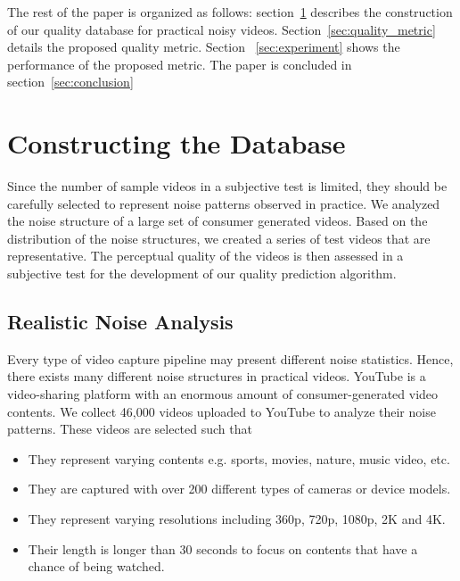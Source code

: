\documentclass{sig-alternate}
\begin{document}
The rest of the paper is organized as follows: section~\ref{sec:noise_quailty_database} describes the construction of our quality database for practical noisy videos. Section~\ref{sec:quality_metric} details the proposed quality metric. Section ~\ref{sec:experiment} shows the performance of the proposed metric. The paper is concluded in section~\ref{sec:conclusion}

\section{Constructing the Database}
\label{sec:noise_quailty_database}
Since the number of sample videos in a subjective test is limited, they should be carefully selected to represent noise patterns observed in practice. We analyzed the noise structure of a large set of consumer generated videos. Based on the distribution of the noise structures, we created a series of test videos that are representative. The perceptual quality of the videos is then assessed in a subjective test for the development of our quality prediction algorithm.
\subsection{Realistic Noise Analysis}
\label{sec:noise_analysis}
Every type of video capture pipeline may present different noise statistics. Hence, there exists many different noise structures in practical videos. YouTube is a video-sharing platform with an enormous amount of consumer-generated video contents. We collect 46,000 videos uploaded to YouTube to analyze their noise patterns. These videos are selected such that
\begin{itemize}[leftmargin=*]
\setlength\itemsep{-0.2em}
\item They represent varying contents e.g. sports, movies, nature, music video, etc. 
\item They are captured with over 200 different types of cameras or device models.
\item They represent varying resolutions including 360p, 720p, 1080p, 2K and 4K.
\item Their length is longer than 30 seconds to focus on contents that have a chance of being watched. 
\end{itemize}
\end{document}
